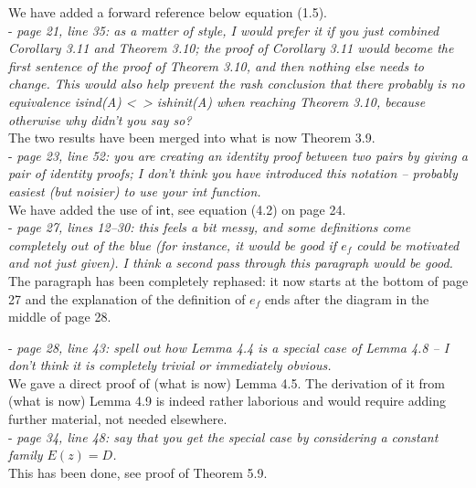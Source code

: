 \documentclass[11pt, oneside]{article}   	%
\begin{document}
We have added a forward reference below equation (1.5).  \\

- \emph{page 21, line 35: as a matter of style, I would prefer it if you just combined Corollary 3.11 and Theorem 3.10; the proof of Corollary 3.11 would become the first sentence of the proof of Theorem 3.10, and then nothing else needs to change. This would also help prevent the rash conclusion that there probably is no
 equivalence isind(A) <~> ishinit(A) when reaching Theorem 3.10, because otherwise why didn't you say so?} \\ 

The two results have been merged into what is now Theorem 3.9. \\

- \emph{page 23, line 52: you are creating an identity proof between two pairs by giving a pair of identity proofs; I don't think you have introduced this notation -- probably easiest (but noisier) to use your int function.} \\

We have added the use of $\mathsf{int}$, see equation (4.2) on page 24. \\

- \emph{page 27, lines 12--30: this feels a bit messy, and some definitions come completely out of the blue (for instance, it would be good if $e_f$ could be motivated and not just given). I think a second pass through this paragraph would be good.} \\

The paragraph has been completely rephased: it now starts at the bottom of page 27 and the explanation of the definition of $e_f$ ends after the diagram in the middle of page 28.

- \emph{page 28, line 43: spell out how Lemma 4.4 is a special case of Lemma 4.8 -- I don't think it is completely trivial or immediately obvious.} \\

We gave a direct proof of (what is now) Lemma 4.5. The derivation of it from (what is now) Lemma 4.9 is indeed rather laborious and would require adding further material, not needed elsewhere. \\

- \emph{page 34, line 48: say that you get the special case by considering a constant family $E(z) = D$.} \\ 

This has been done, see proof of Theorem 5.9. \\ 
\end{document}
